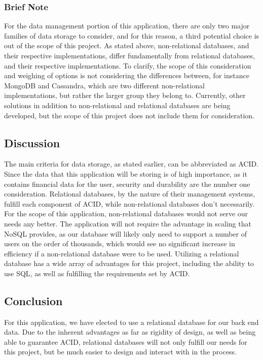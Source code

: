 \documentclass[onecolumn, draftclsnofoot,10pt, compsoc]{IEEEtran}
\begin{document}
 
\subsubsection{Brief Note}
For the data management portion of this application, there are only two major families of data storage to consider, and for this reason, a third potential choice is out of the scope of this project. As stated above, non-relational databases, and their respective implementations, differ fundamentally from relational databases, and their respective implementations. To clarify, the scope of this consideration and weighing of options is not considering the differences between, for instance MongoDB and Cassandra, which are two different non-relational implementations, but rather the larger group they belong to. Currently, other solutions in addition to non-relational and relational databases are being developed, but the scope of this project does not include them for consideration.

\subsection{Discussion}
The main criteria for data storage, as stated earlier, can be abbreviated as ACID. Since the data that this application will be storing is of high importance, as it contains financial data for the user, security and durability are the number one consideration. Relational databases, by the nature of their management systems, fulfill each component of ACID, while non-relational databases don't necessarily.  For the scope of this application, non-relational databases would not serve our needs any better. The application will not require the advantage in scaling that NoSQL provides, as our database will likely only need to support a number of users on the order of thousands, which would see no significant increase in efficiency if a non-relational database were to be used. Utilizing a relational database has a wide array of advantages for this project, including the ability to use SQL, as well as fulfilling the requirements set by ACID.


\subsection{Conclusion}
For this application, we have elected to use a relational database for our back end data. Due to the inherent advantages as far as rigidity of design, as well as being able to guarantee ACID, relational databases will not only fulfill our needs for this project, but be much easier to design and interact with in the process. 
\end{document}
